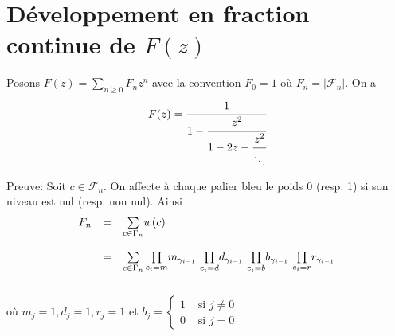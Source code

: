 \section{Développement en fraction continue de $F(z)$}
\begin{proposition} \label{Fn-frac} Posons $F(z) = \underset{n \geq 0}{\sum}F_{n}z^{n}$ avec la convention $F_{0}=1$ où $F_{n} = |\mathcal{F}_{n}|$.
	On a $$F(z) = \cfrac{1}{1 - \cfrac{z^2}{1 - 2z - \cfrac{z^2}{\ddots}}}$$\vspace{5pt}
\end{proposition}
Preuve:
Soit $c \in \mathcal{F}_n$.
On affecte à chaque palier bleu le poids 0 (resp. 1) si son niveau est nul (resp. non
nul).
Ainsi
\[
	\begin{array} {l l l}
		F_{n} & =       & \underset{c \in \Gamma_{n}}{\sum}w(c)                                                                    \\
		      & \text{} &                                                                                                          \\
		      & =       & \sum\limits_{c\in \Gamma_{n}}\underset{c_{i}=m}{\prod}m_{\gamma_{i-1}}\text{ } \underset{c_{i}=d}{\prod}
		d_{\gamma_{i-1}}\text{ }\underset{c_{i}=b}{\prod}b_{\gamma_{i-1}}\text{ }\underset{c_{i}=r}
		{\prod}r_{\gamma_{i-1}}                                                                                                    \\
	\end{array}
\]
\text{}\vspace{10pt}\\
où $m_{j}=1, d_{j}=1, r_{j}=1$ et $b_{j} = \begin{cases}
		1 & \text{ si } j\neq 0 \\
		0 & \text{ si } j=0
	\end{cases}$\\
